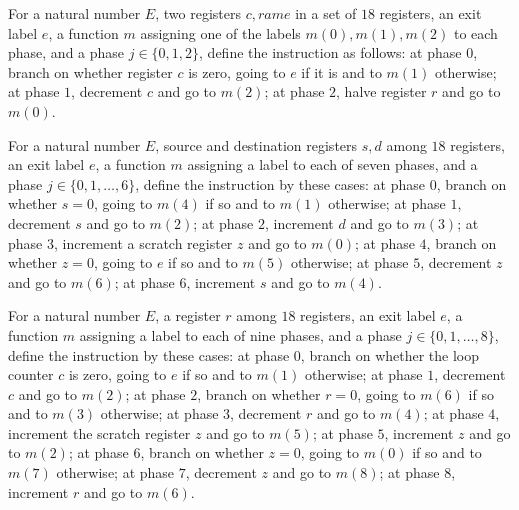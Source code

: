 \begin{definition}
\label{Complexity.LogProg.SavitchARM.hvI}
\leanok
{}
For a natural number $E$, two registers $c,r
ame$ in a set of $18$ registers, an exit label $e$, a function $m$ assigning one of the
labels $m(0),m(1),m(2)$ to each phase, and a phase $j\in\{0,1,2\}$, define the
instruction as follows: at phase $0$, branch on whether register $c$ is zero, going to
$e$ if it is and to $m(1)$ otherwise; at phase $1$, decrement $c$ and go to $m(2)$; at
phase $2$, halve register $r$ and go to $m(0)$.
\end{definition}

\begin{definition}
\label{Complexity.LogProg.SavitchARM.cpI}
\leanok
{}
For a natural number $E$, source and destination registers $s,d$ among $18$ registers,
an exit label $e$, a function $m$ assigning a label to each of seven phases, and a phase
$j\in\{0,1,\ldots,6\}$, define the instruction by these cases: at phase $0$, branch on
whether $s=0$, going to $m(4)$ if so and to $m(1)$ otherwise; at phase $1$, decrement
$s$ and go to $m(2)$; at phase $2$, increment $d$ and go to $m(3)$; at phase $3$,
increment a scratch register $z$ and go to $m(0)$; at phase $4$, branch on whether
$z=0$, going to $e$ if so and to $m(5)$ otherwise; at phase $5$, decrement $z$ and go to
$m(6)$; at phase $6$, increment $s$ and go to $m(4)$.
\end{definition}

\begin{definition}
\label{Complexity.LogProg.SavitchARM.shI}
\leanok
{}
For a natural number $E$, a register $r$ among $18$ registers, an exit label $e$, a
function $m$ assigning a label to each of nine phases, and a phase
$j\in\{0,1,\ldots,8\}$, define the instruction by these cases: at phase $0$, branch on
whether the loop counter $c$ is zero, going to $e$ if so and to $m(1)$ otherwise; at
phase $1$, decrement $c$ and go to $m(2)$; at phase $2$, branch on whether $r=0$, going
to $m(6)$ if so and to $m(3)$ otherwise; at phase $3$, decrement $r$ and go to $m(4)$;
at phase $4$, increment the scratch register $z$ and go to $m(5)$; at phase $5$,
increment $z$ and go to $m(2)$; at phase $6$, branch on whether $z=0$, going to $m(0)$
if so and to $m(7)$ otherwise; at phase $7$, decrement $z$ and go to $m(8)$; at phase
$8$, increment $r$ and go to $m(6)$.
\end{definition}

